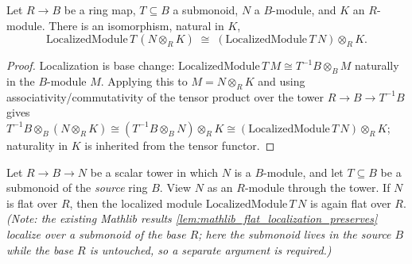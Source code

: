 \begin{lemma}
  \label{lem:gf_localizedModule_baseChange_tensor_comm}
  Let \(R \to B\) be a ring map, \(T \subseteq B\) a submonoid, \(N\) a \(B\)-module,
  and \(K\) an \(R\)-module. There is an isomorphism, natural in \(K\),
  \[
    \mathrm{LocalizedModule}\,T\,(N \otimes_R K)
      \;\cong\; (\mathrm{LocalizedModule}\,T\,N) \otimes_R K .
  \]
\end{lemma}
\begin{proof}

\leanok
  Localization is base change: \(\mathrm{LocalizedModule}\,T\,M \cong T^{-1}B \otimes_B M\)
  naturally in the \(B\)-module \(M\). Applying this to \(M = N \otimes_R K\) and using
  associativity/commutativity of the tensor product over the tower
  \(R \to B \to T^{-1}B\) gives
  \(T^{-1}B \otimes_B (N \otimes_R K) \cong (T^{-1}B \otimes_B N) \otimes_R K
  \cong (\mathrm{LocalizedModule}\,T\,N) \otimes_R K\); naturality in \(K\) is inherited
  from the tensor functor.
\end{proof}

\begin{lemma}
  \label{lem:gf_flat_localizedModule_sameBase}
  Let \(R \to B \to N\) be a scalar tower in which \(N\) is a \(B\)-module, and let
  \(T \subseteq B\) be a submonoid of the \emph{source} ring \(B\). View \(N\) as an
  \(R\)-module through the tower. If \(N\) is flat over \(R\), then the localized module
  \(\mathrm{LocalizedModule}\,T\,N\) is again flat over \(R\). \emph{(Note: the existing
  Mathlib results \cref{lem:mathlib_flat_localization_preserves} localize over a
  submonoid of the \emph{base} \(R\); here the submonoid lives in the source \(B\) while
  the base \(R\) is untouched, so a separate argument is required.)}
\end{lemma}

